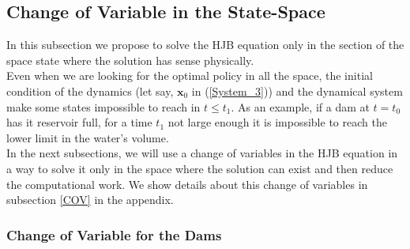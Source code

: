 \subsection{Change of Variable in the State-Space}

In this subsection we propose to solve the HJB equation only in the section of the space state where the solution has sense physically.\\
Even when we are looking for the optimal policy in all the space, the initial condition of the dynamics (let say, $\bm{x}_0$ in (\ref{System_3})) and the dynamical system make some states impossible to reach in $t\leq t_1$. As an example, if a dam at $t=t_0$ has it reservoir full, for a time $t_1$ not large enough it is impossible to reach the lower limit in the water's volume.\\
In the next subsections, we will use a change of variables in the HJB equation in a way to solve it only in the space where the solution can exist and then reduce the computational work. We show details about this change of variables in subsection \ref{COV} in the appendix.

\subsubsection{Change of Variable for the Dams} \label{Subsection_Transformation_Dams}

